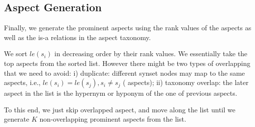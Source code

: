 \subsection{Aspect Generation}
\label{sec:generation}
Finally, we generate the prominent aspects 
using the rank values of the aspects as well as the is-a relations
in the aspect taxonomy.

We sort $le(s_i)$ in decreasing order by their rank values.
We essentially take the top aspects from the sorted list.
However there might be two types of overlapping that we need to
avoid:
i) duplicate: different synset nodes may map to the same aspects, 
i.e., $le(s_i) = le(s_j), s_i \neq s_j$ ( aspects);
ii) taxonomy overlap: the later aspect in the list is the 
hypernym or hyponym of the one of previous aspects.

To this end, we just skip overlapped aspect, and move along the list
until we generate $K$ non-overlapping prominent aspects from the list.


%

